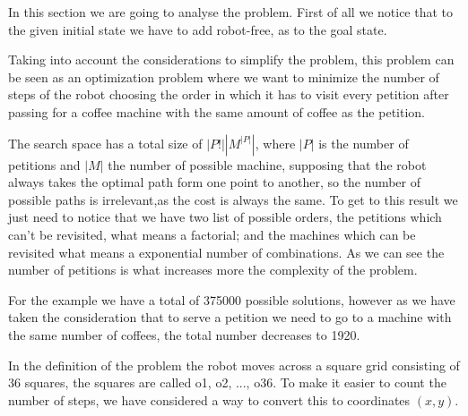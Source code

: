 \documentclass[12pt,a4paper,oneside]{article}
\numberwithin{equation}{section}
\numberwithin{equation}{section}
\theoremstyle{definition}
\begin{document}
In this section we are going to  analyse the problem. First of all we notice that to the given initial state we have to  add robot-free, as to the goal state.

Taking into account the considerations to simplify the problem, this problem can be seen as an optimization problem where we want to minimize the number of steps of the robot choosing the order in which it has to visit every petition after passing for a coffee machine with the same amount of coffee as the petition. 

The search space has a total size of $|P!||M^{|P|}|$, where $|P|$ is the number of petitions and $|M|$ the number of possible machine, supposing that the robot always takes the optimal path form one point to another, so the number of possible paths is irrelevant,as the cost is always the same. To get to this result we just need to notice that we have two list of possible orders, the petitions which can't be revisited, what means a factorial; and the machines which can be revisited what means a exponential number of combinations. As we can see the number of petitions is what increases more the complexity of the problem.

For the example we have a total of 375000 possible solutions, however as we have taken the consideration that to serve a petition we need to go to a machine with the same number of coffees, the total number decreases to 1920.

In the definition of the problem the robot moves across a square grid consisting of 36 squares, the squares are called o1, o2, ..., o36. To make it easier to count the number of steps, we have considered a way to convert this to coordinates $(x,y)$.
\end{document}
